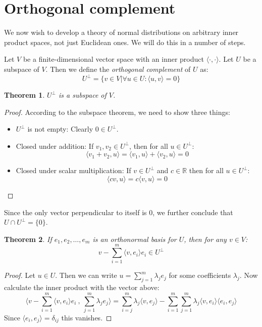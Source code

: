 \documentclass[12pt, a4paper]{article}
\newtheorem{theorem}{Theorem}[section]
\numberwithin{equation}{section}
\begin{document}
\section{Orthogonal complement}
We now wish to develop a theory of normal distributions on arbitrary inner product spaces, not just Euclidean ones. We will do this in a number of steps.

Let $V$ be a finite-dimensional vector space with an inner product $\langle\cdot,\cdot\rangle$. Let $U$ be a subspace of $V$. Then we define the \textit{orthogonal complement} of $U$ as:
\begin{equation}
U^\perp=\{v\in V|\forall u\in U: \langle u, v\rangle = 0\}
\end{equation}
\begin{theorem}
$U^\perp$ is a subspace of $V$.
\end{theorem}
\begin{proof}
According to the subspace theorem, we need to show three things:
\begin{itemize}
\item $U^\perp$ is not empty: Clearly $0\in U^\perp$.
\item Closed under addition: If $v_1,v_2\in U^\perp$, then for all $u\in U^\perp$:
\begin{equation}
\langle v_1+v_2,u\rangle=\langle v_1,u\rangle + \langle v_2,u\rangle = 0 
\end{equation}
\item Closed under scalar multiplication: If $v\in U^\perp$ and $c\in\mathbb{R}$ then for all $u\in U^\perp$:
\begin{equation}
\langle cv,u\rangle = c\langle v,u\rangle = 0
\end{equation}
\end{itemize}
\end{proof}

Since the only vector perpendicular to itself is $0$, we further conclude that $U\cap U^\perp=\{0\}$.

\begin{theorem}
If $e_1, e_2,\ldots,e_m$ is an orthonormal basis for $U$, then for any $v\in V$:
\begin{equation}
v-\sum_{i=1}^m\langle v,e_i\rangle e_i\in U^\perp
\end{equation}
\end{theorem}
\begin{proof}
Let $u\in U$. Then we can write $u=\sum_{j=1}^m\lambda_j e_j$ for some coefficients $\lambda_j$. Now calculate the inner product with the vector above:
\begin{equation}
\langle v-\sum_{i=1}^m\langle v,e_i\rangle e_i\ ,\ \sum_{j=1}^m\lambda_j e_j\rangle=\sum_{i=j}^m\lambda_j\langle v,e_j\rangle-\sum_{i=1}^m\sum_{j=1}^m\lambda_j\langle v,e_i\rangle\langle e_i,e_j\rangle
\end{equation}
Since $\langle e_i,e_j\rangle=\delta_{ij}$ this vanishes.
\end{proof}
\end{document}
